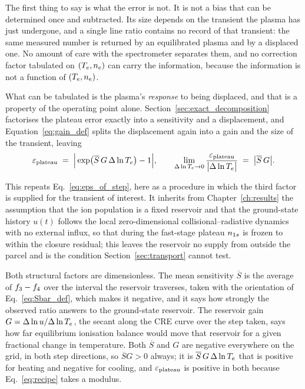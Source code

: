 The first thing to say is what the error is not. It is not a bias that can be
determined once and subtracted. Its size depends on the transient the plasma has
just undergone, and a single line ratio contains no record of that transient:
the same measured number is returned by an equilibrated plasma and by a
displaced one. No amount of care with the spectrometer separates them, and no
correction factor tabulated on $(T_e,n_e)$ can carry the information, because
the information is not a function of $(T_e,n_e)$.

What can be tabulated is the plasma's \emph{response} to being displaced, and
that is a property of the operating point alone. Section~\ref{sec:exact_decomposition}
factorises the plateau error exactly into a sensitivity and a displacement, and
Equation~\eqref{eq:gain_def} splits the displacement again into a gain and
the size of the transient, leaving
\begin{equation}
  \varepsilon_{\mathrm{plateau}} \;=\; \Big|\exp\!\big(\overline{S}\,G\,\Delta\ln T_e\big)-1\Big| ,
  \qquad
  \lim_{\Delta\ln T_e\to0}\frac{\varepsilon_{\mathrm{plateau}}}{\big|\Delta\ln T_e\big|}
  \;=\; \big|\overline{S}\,G\big| .
  \label{eq:recipe}
\end{equation}

\noindent This repeats Eq.~\eqref{eq:eps_of_step}, here as a procedure in which
the third factor is supplied for the transient of interest. It inherits from Chapter~\ref{ch:results}
the assumption that the ion population is a fixed reservoir
and that the ground-state history $u(t)$ follows the local zero-dimensional
collisional--radiative dynamics with no external influx, so that during the
fast-stage plateau $n_{1s}$ is frozen to within the closure residual; this leaves
the reservoir no supply from outside the parcel and is the condition
Section~\ref{sec:transport} cannot test.

Both structural factors are dimensionless. The mean sensitivity $\overline{S}$
is the average of $f_{3}-f_{4}$ over the interval the reservoir
traverses, taken with the orientation of Eq.~\eqref{eq:Sbar_def}, which makes
it negative, and it says how strongly the observed ratio answers to the
ground-state reservoir. The reservoir gain $G = \Delta\ln u/\Delta\ln T_e$,
the secant along the CRE curve over the step taken, says how far equilibrium
ionisation balance would move that reservoir for a
given fractional change in temperature. Both $\overline{S}$ and $G$ are
negative everywhere on the grid, in both step directions, so
$\overline{S}G > 0$ always; it is $\overline{S}\,G\,\Delta\ln T_e$ that is
positive for heating and negative for cooling, and $\varepsilon_{\mathrm{plateau}}$ is positive in
both because Eq.~\eqref{eq:recipe} takes a modulus.

